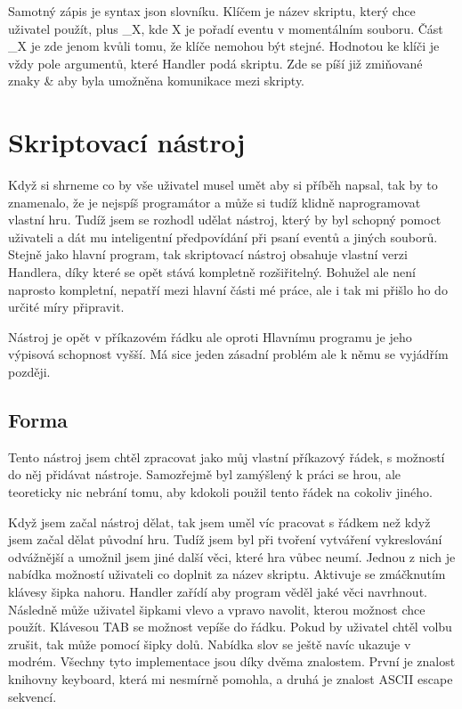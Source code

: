 \documentclass[12pt,a4paper]{article}
\begin{document}
Samotný zápis je syntax json slovníku. Klíčem je název skriptu, který chce uživatel použít, plus \_X, kde X je pořadí eventu v momentálním souboru. Část \_X je zde jenom kvůli tomu, že klíče nemohou být stejné. Hodnotou ke klíči je vždy pole argumentů, které Handler podá skriptu. Zde se píší již zmiňované znaky \& aby byla umožněna komunikace mezi skripty.

\section{Skriptovací nástroj}
Když si shrneme co by vše uživatel musel umět aby si příběh napsal, tak by to znamenalo, že je nejspíš programátor a může si tudíž klidně naprogramovat vlastní hru. Tudíž jsem se rozhodl udělat nástroj, který by byl schopný pomoct uživateli a dát mu inteligentní předpovídání při psaní eventů a jiných souborů. Stejně jako hlavní program, tak skriptovací nástroj obsahuje vlastní verzi Handlera, díky které se opět stává kompletně rozšiřitelný. Bohužel ale není naprosto kompletní, nepatří mezi hlavní části mé práce, ale i tak mi přišlo ho do určité míry připravit.

Nástroj je opět v příkazovém řádku ale oproti Hlavnímu programu je jeho výpisová schopnost vyšší. Má sice jeden zásadní problém ale k němu se vyjádřím později.

\subsection{Forma}
Tento nástroj jsem chtěl zpracovat jako můj vlastní příkazový řádek, s možností do něj přidávat nástroje. Samozřejmě byl zamýšlený k práci se hrou, ale teoreticky nic nebrání tomu, aby kdokoli použil tento řádek na cokoliv jiného. 

Když jsem začal nástroj dělat, tak jsem uměl víc pracovat s řádkem než když jsem začal dělat původní hru. Tudíž jsem byl při tvoření vytváření vykreslování odvážnější a umožnil jsem jiné další věci, které hra vůbec neumí. Jednou z nich je nabídka možností uživateli co doplnit za název skriptu. Aktivuje se zmáčknutím klávesy šipka nahoru. Handler zařídí aby program věděl jaké věci navrhnout. Následně může uživatel šipkami vlevo a vpravo navolit, kterou možnost chce použít. Klávesou TAB se možnost vepíše do řádku. Pokud by uživatel chtěl volbu zrušit, tak může pomocí šipky dolů. Nabídka slov se ještě navíc ukazuje v modrém. Všechny tyto implementace jsou díky dvěma znalostem. První je znalost knihovny keyboard, která mi nesmírně pomohla, a druhá je znalost ASCII escape sekvencí.
\end{document}
